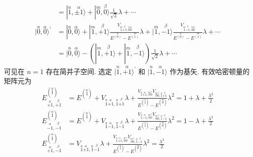 \documentclass[../../main.tex]{subfiles}
\begin{document}
\begin{enumerate}
\begin{align*}
        &= |\stackrel{n}{1},\stackrel{\alpha}{\pm 1}\rangle + |\stackrel{m}{0},\stackrel{\beta}{0}\rangle\frac{1}{\sqrt{2}}\lambda + \cdots\\
        |\stackrel{n}{0},\stackrel{\alpha}{0}\rangle^{\prime} &= |\stackrel{n}{0},\stackrel{\alpha}{0}\rangle
        + |\stackrel{m}{1},\stackrel{\beta}{+1}\rangle\frac{V_{\stackrel{m}{1}\stackrel{\beta}{+1}, \stackrel{n}{0}\stackrel{\alpha}{0}}}{E^{\stackrel{n}{(0)}} - E^{\stackrel{m}{(1)}}}\lambda
        + |\stackrel{m}{1},\stackrel{\beta}{-1}\rangle\frac{V_{\stackrel{m}{1}\stackrel{\beta}{-1}, \stackrel{n}{0}\stackrel{\alpha}{0}}}{E^{\stackrel{n}{(0)}} - E^{\stackrel{m}{(1)}}}\lambda + \cdots\\
        &= |\stackrel{n}{0},\stackrel{\alpha}{0}\rangle
         - (|\stackrel{m}{1},\stackrel{\beta}{+1}\rangle + |\stackrel{m}{1},\stackrel{\beta}{-1}\rangle)\frac{1}{\sqrt{2}}\lambda + \cdots
    \end{align*}
    可见在 $n=1$ 存在简并子空间. 选定 $|\stackrel{n}{1},\stackrel{\alpha}{+1}\rangle^{\prime}$ 和 $|\stackrel{n}{1},\stackrel{\alpha}{-1}\rangle$ 作为基矢. 有效哈密顿量的矩阵元为
    \begin{align*}
        E^{(\stackrel{n}{1})}_{\stackrel{\alpha}{+1},\stackrel{\beta}{+1}} &= 
        E^{(\stackrel{n}{1})} 
        + V_{\stackrel{n}{1}\stackrel{\alpha}{+1},\stackrel{n}{1}\stackrel{\beta}{+1}}\lambda 
        + \frac{V_{\stackrel{n}{1}\stackrel{\alpha}{+1},\stackrel{m}{0}\stackrel{\gamma}{0}}V_{\stackrel{m}{0}\stackrel{\gamma}{0},\stackrel{n}{1}\stackrel{\beta}{+1}}}{E^{(\stackrel{n}{1})} - E^{(\stackrel{m}{0})}}\lambda^{2} = 1 + \lambda + \frac{\lambda^{2}}{2}\\
        E^{(\stackrel{n}{1})}_{\stackrel{\alpha}{-1},\stackrel{\beta}{-1}} &= 
        E^{(\stackrel{n}{1})}
        + V_{\stackrel{n}{1}\stackrel{\alpha}{-1},\stackrel{n}{1}\stackrel{\beta}{-1}}\lambda
        + \frac{V_{\stackrel{n}{1}\stackrel{\alpha}{-1},\stackrel{m}{0}\stackrel{\gamma}{0}}V_{\stackrel{m}{0}\stackrel{\gamma}{0},\stackrel{n}{1}\stackrel{\beta}{-1}}}{E^{(\stackrel{n}{1})} - E^{(\stackrel{m}{0})}}\lambda^{2} = 1 - \lambda + \frac{\lambda^{2}}{2}\\
        E^{(\stackrel{n}{1})}_{\stackrel{\alpha}{+1},\stackrel{\beta}{-1}} &=
        V_{\stackrel{n}{1}\stackrel{\alpha}{+1},\stackrel{n}{1}\stackrel{\beta}{-1}}\lambda + \frac{V_{\stackrel{n}{1}\stackrel{\alpha}{+1},\stackrel{m}{0}\stackrel{\gamma}{0}}V_{\stackrel{m}{0}\stackrel{\gamma}{0},\stackrel{n}{1}\stackrel{\beta}{-1}}}{E^{(\stackrel{n}{1})} - E^{(\stackrel{m}{0})}}\lambda^{2} =  \frac{\lambda^{2}}{2}\\

\end{align*}
\end{enumerate}
\end{document}
